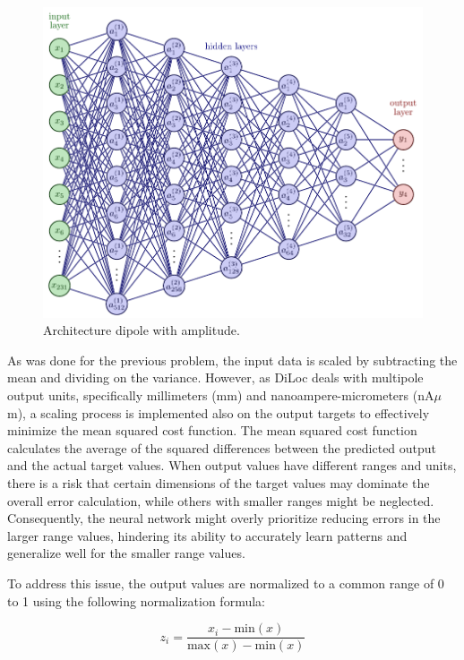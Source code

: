 \documentclass[a4paper, UKenglish, 11pt]{uiomaster}
\begin{document}
\begin{figure}[!htb]
    \centering
    \includegraphics[width=\linewidth]{figures/NN_dipole_w_amplitude_architecture.pdf}
    \caption{Architecture dipole with amplitude.}
    \label{fig:NN_dipole_w_amplitude_architecture}
\end{figure}

As was done for the previous problem, the input data is scaled by subtracting the mean and dividing on the variance. However, as DiLoc deals with multipole output units, specifically millimeters (mm) and nanoampere-micrometers (nA$\mu$m), a scaling process is implemented also on the output targets to effectively minimize the mean squared cost function. The mean squared cost function calculates the average of the squared differences between the predicted output and the actual target values. When output values have different ranges and units, there is a risk that certain dimensions of the target values may dominate the overall error calculation, while others with smaller ranges might be neglected. Consequently, the neural network might overly prioritize reducing errors in the larger range values, hindering its ability to accurately learn patterns and generalize well for the smaller range values.

To address this issue, the output values are normalized to a common range of 0 to 1 using the following normalization formula:

\begin{equation}
z_i = \frac{x_i - \text{min}(x)}{\text{max}(x) - \text{min}(x)}
\label{eq:scale_target}
\end{equation}
\end{document}
